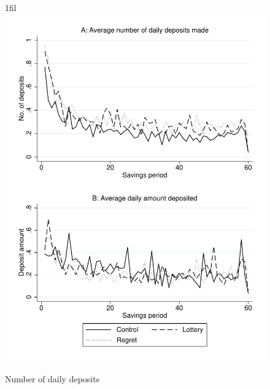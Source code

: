 \documentclass[11pt]{article}
\makeatletter
\newcommand*{\centerfloat}{%
  \parindent \z@
  \leftskip \z@ \@plus 1fil \@minus \textwidth
  \rightskip\leftskip
  \parfillskip \z@skip}
\makeatother
\begin{document}
		\begin{figure}[h]
		\centering
		\caption{Number of daily deposits}
		\centerfloat
		\includegraphics[width=\textwidth]{../../figures/line-deposits.pdf}
		\end{figure}
\end{document}
